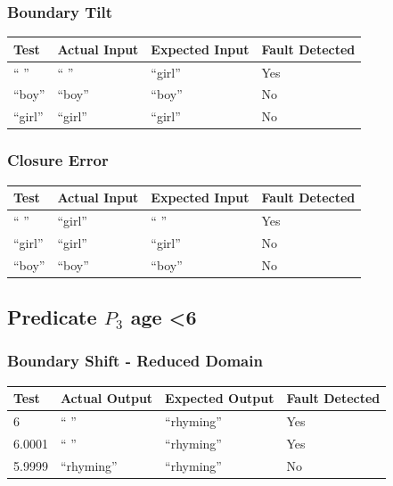 \documentclass[11pt, oneside]{article}   	%
\begin{document}
\subsubsection{Boundary Tilt}
\begin{table}[!htb]
\centering
\begin{tabular}{|l|l|l|l|}
\hline
Test   & Actual Input & Expected Input & Fault Detected \\ \hline
“ ”    & “ ”          & “girl”         & Yes            \\ \hline
“boy”  & “boy”        & “boy”          & No             \\ \hline
“girl” & “girl”       & “girl”         & No             \\ \hline
\end{tabular}
\end{table}

\subsubsection{Closure Error}
\begin{table}[!htb]
\centering
\begin{tabular}{|l|l|l|l|}
\hline
Test   & Actual Input & Expected Input & Fault Detected \\ \hline
“ ”    & “girl”       & “ ”            & Yes            \\ \hline
“girl” & “girl”       & “girl”         & No             \\ \hline
“boy”  & “boy”        & “boy”          & No             \\ \hline
\end{tabular}
\end{table}
\newpage

\subsection{Predicate $P_3$ age \textless 6}
\subsubsection{Boundary Shift - Reduced Domain}
\begin{table}[!htb]
\centering
\begin{tabular}{|l|l|l|l|}
\hline
Test   & Actual Output & Expected Output & Fault Detected \\ \hline
6      & “ ”           & “rhyming”       & Yes            \\ \hline
6.0001 & “ ”           & “rhyming”       & Yes            \\ \hline
5.9999 & “rhyming”     & “rhyming”       & No             \\ \hline
\end{tabular}
\end{table}
\end{document}
